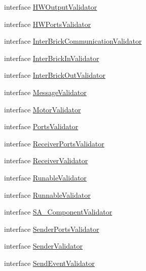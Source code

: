 \begin{DoxyCompactItemize}
interface \hyperlink{interfaceshootingmachineemfmodel_1_1validation_1_1_h_w_output_validator}{H\-W\-Output\-Validator}
\item 
interface \hyperlink{interfaceshootingmachineemfmodel_1_1validation_1_1_h_w_ports_validator}{H\-W\-Ports\-Validator}
\item 
interface \hyperlink{interfaceshootingmachineemfmodel_1_1validation_1_1_inter_brick_communication_validator}{Inter\-Brick\-Communication\-Validator}
\item 
interface \hyperlink{interfaceshootingmachineemfmodel_1_1validation_1_1_inter_brick_in_validator}{Inter\-Brick\-In\-Validator}
\item 
interface \hyperlink{interfaceshootingmachineemfmodel_1_1validation_1_1_inter_brick_out_validator}{Inter\-Brick\-Out\-Validator}
\item 
interface \hyperlink{interfaceshootingmachineemfmodel_1_1validation_1_1_message_validator}{Message\-Validator}
\item 
interface \hyperlink{interfaceshootingmachineemfmodel_1_1validation_1_1_motor_validator}{Motor\-Validator}
\item 
interface \hyperlink{interfaceshootingmachineemfmodel_1_1validation_1_1_ports_validator}{Ports\-Validator}
\item 
interface \hyperlink{interfaceshootingmachineemfmodel_1_1validation_1_1_receiver_ports_validator}{Receiver\-Ports\-Validator}
\item 
interface \hyperlink{interfaceshootingmachineemfmodel_1_1validation_1_1_receiver_validator}{Receiver\-Validator}
\item 
interface \hyperlink{interfaceshootingmachineemfmodel_1_1validation_1_1_runable_validator}{Runable\-Validator}
\item 
interface \hyperlink{interfaceshootingmachineemfmodel_1_1validation_1_1_runnable_validator}{Runnable\-Validator}
\item 
interface \hyperlink{interfaceshootingmachineemfmodel_1_1validation_1_1_s_a___component_validator}{S\-A\-\_\-\-Component\-Validator}
\item 
interface \hyperlink{interfaceshootingmachineemfmodel_1_1validation_1_1_sender_ports_validator}{Sender\-Ports\-Validator}
\item 
interface \hyperlink{interfaceshootingmachineemfmodel_1_1validation_1_1_sender_validator}{Sender\-Validator}
\item 
interface \hyperlink{interfaceshootingmachineemfmodel_1_1validation_1_1_send_event_validator}{Send\-Event\-Validator}

\end{DoxyCompactItemize}

